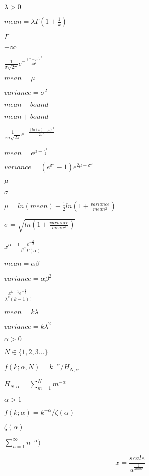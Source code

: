 \documentclass{article}
\begin{document}
$ \lambda > 0$
\pagebreak

$ mean = \lambda\Gamma\left(1+\frac{1}{k}\right) $
\pagebreak

$ \Gamma $
\pagebreak

$-\infty$
\pagebreak

$ \frac{1}{\sigma\sqrt{2\pi}} e^{-\frac{(x-\mu)^2}{s\sigma^2}}$
\pagebreak

$ mean = \mu $
\pagebreak

$ variance = \sigma^2 $
\pagebreak

$mean-bound$
\pagebreak

$mean+bound$
\pagebreak

$ \frac{1}{x\sigma\sqrt{2\pi}} e^{-\frac{(ln(x) - \mu)^2}{2\sigma^2}}$
\pagebreak

$ mean = e^{\mu+\frac{\sigma^2}{2}} $
\pagebreak

$ variance = (e^{\sigma^2}-1)e^{2\mu+\sigma^2}$
\pagebreak

$ \mu $
\pagebreak

$ \sigma $
\pagebreak

$ \mu = ln(mean) - \frac{1}{2}ln\left(1+\frac{variance}{mean^2}\right)$
\pagebreak

$ \sigma = \sqrt{ln\left(1+\frac{variance}{mean^2}\right)}$
\pagebreak

$ x^{\alpha-1} \frac{e^{-\frac{x}{\beta}}}{\beta^\alpha \Gamma(\alpha)}$
\pagebreak

$ mean = \alpha\beta $
\pagebreak

$ variance = \alpha \beta^2$
\pagebreak

$ \frac{x^{k-1} e^{-\frac{x}{\lambda}}}{\lambda^k (k-1)!}$
\pagebreak

$ mean = k \lambda $
\pagebreak

$ variance = k \lambda^2$
\pagebreak

$ \alpha > 0 $
\pagebreak

$ N \in \{1,2,3 \dots\}$
\pagebreak

$ f(k; \alpha, N) = k^{-\alpha}/ H_{N,\alpha} $
\pagebreak

$ H_{N,\alpha} = \sum_{m=1}^N m^{-\alpha} $
\pagebreak

$ \alpha > 1 $
\pagebreak

$ f(k; \alpha) = k^{-\alpha}/\zeta(\alpha) $
\pagebreak

$ \zeta(\alpha) $
\pagebreak

$ \sum_{n=1}^\infty n^{-\alpha} ) $
\pagebreak

\[ x = \frac{scale}{u^{\frac{1}{shape}}} \]
\pagebreak
\end{document}
